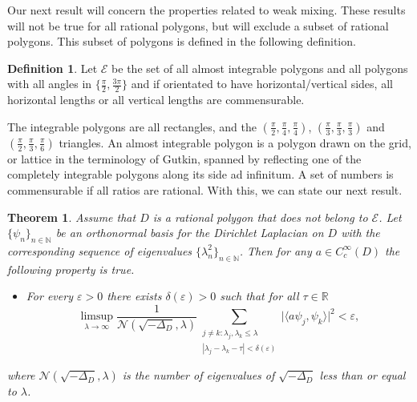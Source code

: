 \documentclass[11pt,twoside,reqno]{amsart}
\newcommand{\R}{\mathbb{R}}
\newcommand{\N}{\mathbb{N}}
\newcommand{\1}{\mathrm{\mathbf{1}}}
\numberwithin{equation}{section}
\theoremstyle{plain}
\newtheorem{theorem}[thm]{Theorem}
\theoremstyle{definition}
\newtheorem{definition}[thm]{Definition}
\theoremstyle{remark}
\begin{document}
Our next result will concern the properties related to weak mixing. These results will not be true for all rational polygons, but will exclude a subset of rational polygons. This subset of polygons is defined in the following definition. 

\begin{definition}
    Let $\mathcal{E}$ be the set of all almost integrable polygons and all polygons with all angles in $\{\frac{\pi}{2},\frac{3\pi}{2}\}$ and if orientated to have horizontal/vertical sides, all horizontal lengths or all vertical lengths are commensurable.
\end{definition}

The integrable polygons are all rectangles, and the $(\frac{\pi}{2},\frac{\pi}{4},\frac{\pi}{4})$, $(\frac{\pi}{3},\frac{\pi}{3},\frac{\pi}{3})$ and $(\frac{\pi}{2},\frac{\pi}{3},\frac{\pi}{6})$ triangles. An almost integrable polygon is a polygon drawn on the grid, or lattice in the terminology of Gutkin, spanned by reflecting one of the completely integrable polygons along its side ad infinitum. A set of numbers is commensurable if all ratios are rational. With this, we can state our next result.

\begin{theorem}\label{thm:main_2}
    Assume that $D$ is a rational polygon that does not belong to $\mathcal{E}$. Let $\{\psi_n\}_{n\in\N}$ be an orthonormal basis for the Dirichlet Laplacian on $D$ with the corresponding sequence of eigenvalues $\{\lambda_n^2\}_{n\in\N}$. Then for any $a\in C^\infty_c(D)$ the following property is true.  
    \begin{itemize}
        \item[$(3)$]
        For every $\varepsilon>0$ there exists $\delta(\varepsilon)>0$ such that for all $\tau\in\R$
        \begin{equation*}
        \limsup_{\lambda\rightarrow \infty}\frac{1}{\mathcal{N}(\sqrt{-\Delta_D},\lambda)} \sum_{\substack{j\neq k: \lambda_j,\lambda_k\leq \lambda  \\ |\lambda_{j}-\lambda_{k}-\tau| < \delta(\varepsilon)}} \big| \langle a \psi_j , \psi_k\rangle  \big|^2 <\varepsilon,
        \end{equation*}
    \end{itemize}
    where $\mathcal{N}(\sqrt{-\Delta_D},\lambda)$ is the number of eigenvalues of $\sqrt{-\Delta_D}$ less than or equal to $\lambda$. 
\end{theorem}
\end{document}
